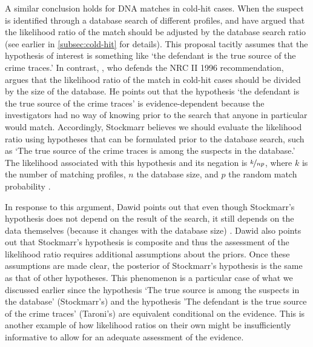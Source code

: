 \documentclass{article}
\begin{document}
A similar conclusion holds for DNA matches in cold-hit cases. When the suspect is identified through a database search of different profiles,  \cite{taroni2006bayesian} and
\cite{balding1996EvaluatingDNAProfilea} have argued that the likelihood ratio of the match %
should be adjusted by the database search ratio (see  earlier in \ref{subsec:cold-hit} for details). 
This proposal tacitly assumes that the hypothesis of interest is something like
`the defendant is the true source of the crime traces.'
In contrast, \cite{stockmarr1999LikelihoodRatiosEvaluating}, who defends the NRC II 1996  recommendation, argues 
that
the likelihood ratio of the match in cold-hit cases should be divided by the size of the database. He points out that the hypothesis `the defendant is the true source of the crime traces'
is evidence-dependent because the investigators had no way of knowing prior to the search that anyone in particular would  match. %
Accordingly, Stockmarr believes we should evaluate the likelihood ratio using hypotheses that can be formulated prior to the database search, such as `The true source of the crime traces is among the suspects in the database.' The likelihood associated with this hypothesis and its negation is $\nicefrac{k}{np}$, where $k$ is the number of matching profiles, $n$ the database size, and $p$ the random match probability \citep[see][for a derivation]{stockmarr1999LikelihoodRatiosEvaluating}.


In response to this argument, Dawid points out that even though Stockmarr's hypothesis does not depend on the result of the search, it still depends on the data themselves (because 
it changes  with the database size) \citep{dawid2001CommentStockmarrLikelihood}.  Dawid also points out that Stockmarr's hypothesis is composite and thus the assessment of the likelihood ratio requires additional assumptions about the priors. Once these assumptions are made clear, the posterior of Stockmarr's hypothesis is the same as that of other hypotheses. 
This phenomenon is a particular case of what we   discussed earlier since the hypothesis `The true source is among the suspects in the database' (Stockmarr's) and the hypothesis 'The defendant is the true source of the crime traces' (Taroni's) are equivalent conditional on the evidence. 
This is another example of how likelihood ratios on their own might be  insufficiently informative to allow for an adequate assessment of the evidence. 
\end{document}

